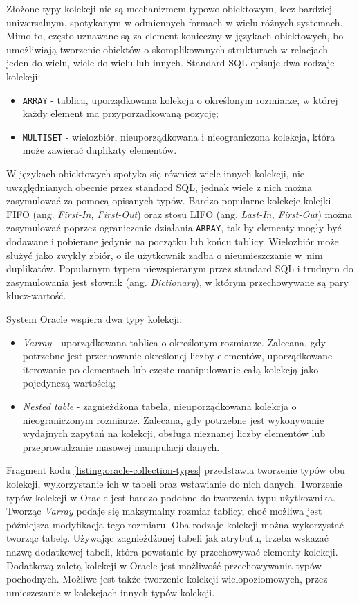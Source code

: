 \documentclass[a4paper,twoside,12pt]{book}
\begin{document}
Złożone typy kolekcji nie są mechanizmem typowo obiektowym, lecz bardziej uniwersalnym, spotykanym w odmiennych formach w wielu różnych systemach. Mimo to, często uznawane są za element konieczny w językach obiektowych, bo umożliwiają tworzenie obiektów o skomplikowanych strukturach w relacjach jeden-do-wielu, wiele-do-wielu lub innych. Standard SQL opisuje dwa rodzaje kolekcji: 
\begin{itemize}
\item \lstinline{ARRAY} - tablica, uporządkowana kolekcja o określonym rozmiarze, w której każdy element ma przyporzadkowaną pozycję;
\item \lstinline{MULTISET} - wielozbiór, nieuporządkowana i nieograniczona kolekcja, która może zawierać duplikaty elementów.
\end{itemize}

W językach obiektowych spotyka się również wiele innych kolekcji, nie uwzględnianych obecnie przez standard SQL, jednak wiele z nich można zasymulować za pomocą opisanych typów. 
Bardzo popularne kolekcje kolejki FIFO (ang. \textit{First-In, First-Out}) oraz stosu LIFO (ang. \textit{Last-In, First-Out}) można zasymulować poprzez ograniczenie działania \lstinline{ARRAY}, tak by elementy mogły być dodawane i pobierane jedynie na początku lub końcu tablicy.  
Wielozbiór może służyć jako zwykły zbiór, o ile użytkownik zadba o nieumieszczanie w~nim duplikatów. Popularnym typem niewspieranym przez standard SQL i trudnym do zasymulowania jest słownik (ang. \textit{Dictionary}), w którym przechowywane są pary klucz-wartość.

System Oracle wspiera dwa typy kolekcji: 
\begin{itemize}
\item \textit{Varray} - uporządkowana tablica o określonym rozmiarze. Zalecana, gdy potrzebne jest przechowanie określonej liczby elementów, uporządkowane iterowanie po elementach lub częste manipulowanie całą kolekcją jako pojedynczą wartością;
\item \textit{Nested table} - zagnieżdżona tabela, nieuporządkowana kolekcja o nieograniczonym rozmiarze. Zalecana, gdy potrzebne jest wykonywanie wydajnych zapytań na kolekcji, obsługa nieznanej liczby elementów lub przeprowadzanie masowej manipulacji danych.
\end{itemize}

Fragment kodu \ref{listing:oracle-collection-types} przedstawia tworzenie typów obu kolekcji, wykorzystanie ich w tabeli oraz wstawianie do nich danych. Tworzenie typów kolekcji w Oracle jest bardzo podobne do tworzenia typu użytkownika. Tworząc \textit{Varray} podaje się maksymalny rozmiar tablicy, choć możliwa jest późniejsza modyfikacja tego rozmiaru. Oba rodzaje kolekcji można wykorzystać tworząc tabelę. Używając zagnieżdżonej tabeli jak atrybutu, trzeba wskazać nazwę dodatkowej tabeli, która powstanie by przechowywać elementy kolekcji. Dodatkową zaletą kolekcji w Oracle jest możliwość przechowywania typów pochodnych. Możliwe jest także tworzenie kolekcji wielopoziomowych, przez umieszczanie w kolekcjach innych typów kolekcji.
\end{document}
